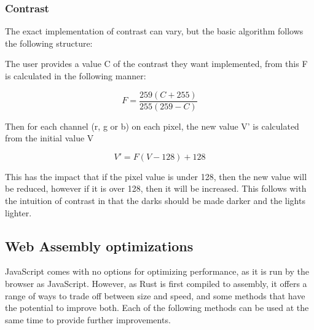 \documentclass[12pt,a4paper]{article}
\begin{document}
\subsubsection{Contrast}

The exact implementation of contrast can vary, but the basic algorithm follows the following structure:

The user provides a value C of the contrast they want implemented, from this F is calculated in the following manner:

$$
    F=\frac{259(C+255)}{255(259-C)}
$$

Then for each channel (r, g or b) on each pixel, the new value V' is calculated from the initial value V

$$
    V'=F(V-128)+128
$$

This has the impact that if the pixel value is under 128, then the new value will be reduced, however if it is over 128, then it will be increased. This follows with the intuition of contrast in that the darks should be made darker and the lights lighter.

\subsection{Web Assembly optimizations}

JavaScript comes with no options for optimizing performance, as it is run by the browser as JavaScript. However, as Rust is first compiled to assembly, it offers a range of ways to trade off between size and speed, and some methods that have the potential to improve both. Each of the following methods can be used at the same time to provide further improvements.
\end{document}
